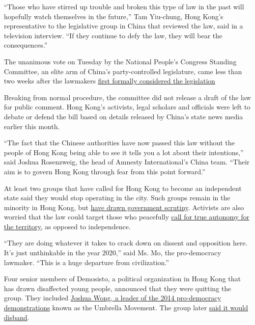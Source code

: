 ``Those who have stirred up trouble and broken this type of law in the
past will hopefully watch themselves in the future,'' Tam Yiu-chung,
Hong Kong's representative to the legislative group in China that
reviewed the law, said in a television interview. ``If they continue to
defy the law, they will bear the consequences.''

The unanimous vote on Tuesday by the National People's Congress Standing
Committee, an elite arm of China's party-controlled legislature, came
less than two weeks after the lawmakers
\href{https://www.nytimes.com/2020/06/20/world/asia/china-hong-kong-security-law.html}{first
formally considered the legislation}

Breaking from normal procedure, the committee did not release a draft of
the law for public comment. Hong Kong's activists, legal scholars and
officials were left to debate or defend the bill based on details
released by China's state news media earlier this month.

``The fact that the Chinese authorities have now passed this law without
the people of Hong Kong being able to see it tells you a lot about their
intentions,'' said Joshua Rosenzweig, the head of Amnesty
International's China team. ``Their aim is to govern Hong Kong through
fear from this point forward.''

At least two groups that have called for Hong Kong to become an
independent state said they would stop operating in the city. Such
groups remain in the minority in Hong Kong, but
\href{https://www.nytimes.com/2018/09/24/world/asia/hong-kong-party-ban-andy-chan.html}{have
drawn government scrutiny}. Activists are also worried that the law
could target those who peacefully
\href{https://www.nytimes.com/2019/08/12/world/asia/hong-kong-protests-communist-party.html}{call
for true autonomy for the territory}, as opposed to independence.

``They are doing whatever it takes to crack down on dissent and
opposition here. It's just unthinkable in the year 2020,'' said Ms. Mo,
the pro-democracy lawmaker. ``This is a huge departure from
civilization.''

Four senior members of Demosisto, a political organization in Hong Kong
that has drawn disaffected young people, announced that they were
quitting the group. They included
\href{https://www.nytimes.com/2019/10/29/world/asia/joshua-wong-hong-kong-protests.html}{Joshua
Wong, a leader of the 2014 pro-democracy demonstrations} known as the
Umbrella Movement. The group later
\href{https://www.facebook.com/demosisto/posts/1464823310393153}{said it
would disband}.

